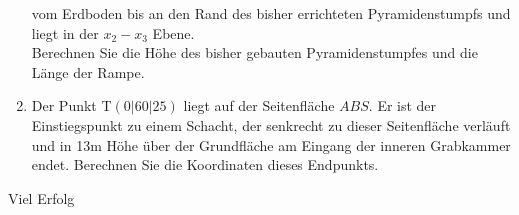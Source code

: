 \documentclass[a4paper,12pt]{article}
\begin{document}
\begin{enumerate}[label={\alph*)}]
  vom Erdboden bis an den Rand des bisher errichteten Pyramidenstumpfs und liegt in der $x_2-x_3$ Ebene.\\
    
    Berechnen Sie die Höhe des bisher gebauten Pyramidenstumpfes und die Länge der Rampe.\\

  \item  Der Punkt T$(0|60|25)$ liegt auf der Seitenfläche $ABS$. Er ist der Einstiegspunkt zu einem Schacht, der senkrecht zu dieser Seitenfläche verläuft und in 13m Höhe über der Grundfläche am Eingang der inneren Grabkammer endet. Berechnen Sie die Koordinaten dieses Endpunkts.
\end{enumerate}



\centerline{Viel Erfolg}









\end{document}
